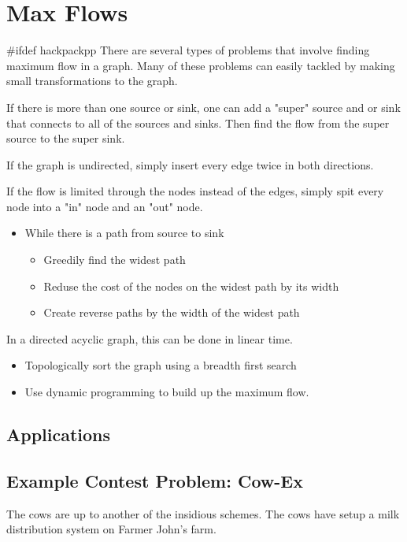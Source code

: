 \section{Max Flows}
#ifdef hackpackpp
There are several types of problems that involve finding maximum flow in a graph.
Many of these problems can easily tackled by making small transformations to the graph.


If there is more than one source or sink,  one can add a "super" source and or sink that connects to all of the sources and sinks.
Then find the flow from the super source to the super sink.


If the graph is undirected, simply insert every edge twice in both directions.


If the flow is limited through the nodes instead of the edges, simply spit every node into a "in" node and an "out" node.


\begin{itemize}
	\item While there is a path from source to sink
	\begin{itemize}
		\item Greedily find the widest path
		\item Reduse the cost of the nodes on the widest path by its width
		\item Create reverse paths by the width of the widest path
	\end{itemize}
\end{itemize}

In a directed acyclic graph, this can be done in linear time.

\begin{itemize}
	\item Topologically sort the graph using a breadth first search
	\item Use dynamic programming to build up the maximum flow.
\end{itemize}

\subsection{Applications}
\subsection{Example Contest Problem: Cow-Ex}
The cows are up to another of the insidious schemes.
The cows have setup a milk distribution system on Farmer John's farm.


